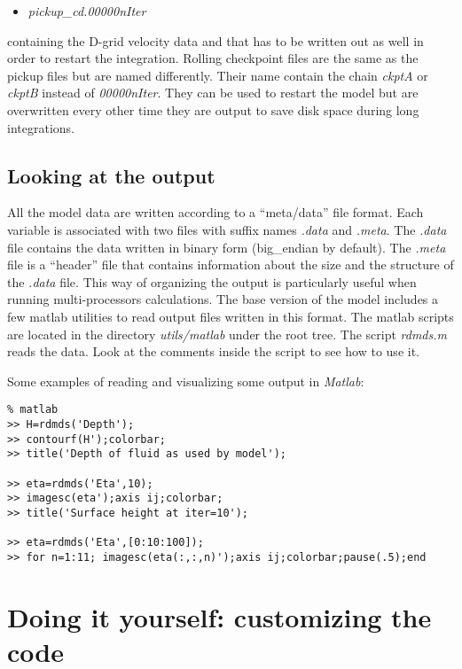 \begin{itemize}
\item \textit{pickup\_cd.00000nIter}
\end{itemize}

containing the D-grid velocity data and that has to be written out as well
in order to restart the integration. Rolling checkpoint files are the same
as the pickup files but are named differently. Their name contain the chain 
\textit{ckptA} or \textit{ckptB} instead of \textit{00000nIter}. They can be
used to restart the model but are overwritten every other time they are
output to save disk space during long integrations.

\subsection{Looking at the output}

All the model data are written according to a ``meta/data'' file format.
Each variable is associated with two files with suffix names \textit{.data}
and \textit{.meta}. The \textit{.data} file contains the data written in
binary form (big\_endian by default). The \textit{.meta} file is a
``header'' file that contains information about the size and the structure
of the \textit{.data} file. This way of organizing the output is
particularly useful when running multi-processors calculations. The base
version of the model includes a few matlab utilities to read output files
written in this format. The matlab scripts are located in the directory 
\textit{utils/matlab} under the root tree. The script \textit{rdmds.m} reads
the data. Look at the comments inside the script to see how to use it.

Some examples of reading and visualizing some output in {\em Matlab}:
\begin{verbatim}
% matlab
>> H=rdmds('Depth');
>> contourf(H');colorbar;
>> title('Depth of fluid as used by model');

>> eta=rdmds('Eta',10);
>> imagesc(eta');axis ij;colorbar;
>> title('Surface height at iter=10');

>> eta=rdmds('Eta',[0:10:100]);
>> for n=1:11; imagesc(eta(:,:,n)');axis ij;colorbar;pause(.5);end
\end{verbatim}

\section{Doing it yourself: customizing the code}

